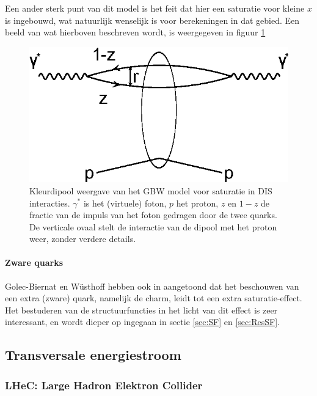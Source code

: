 \documentclass[a4paper,11pt]{article}
\numberwithin{equation}{section} %
\begin{document}
Een ander sterk punt van dit model is het feit dat hier een saturatie voor kleine $x$ is ingebouwd, wat natuurlijk wenselijk is voor berekeningen in dat gebied.
Een beeld van wat hierboven beschreven wordt, is weergegeven in figuur \ref{fig:GBW}
\begin{figure} [H]
  \begin{center}
    \includegraphics[width=.66\textwidth]{Afbeeldingen/GBW.eps}
    \caption{Kleurdipool weergave van het GBW model voor saturatie in DIS interacties. $\gamma^*$ is het (virtuele) foton, $p$ het proton, $z$ en $1-z$ de fractie van de impuls van het foton gedragen door de twee quarks. De verticale ovaal stelt de interactie van de dipool met het proton weer, zonder verdere details. \cite{ET}}
   \label{fig:GBW}
  \end{center}
\end{figure}

      \paragraph{Zware quarks}
Golec-Biernat en Wüsthoff hebben ook in \cite{GBW} aangetoond dat het beschouwen van een extra (zware) quark, namelijk de charm, leidt tot een extra saturatie-effect.
Het bestuderen van de structuurfuncties in het licht van dit effect is zeer interessant, en wordt dieper op ingegaan in sectie \ref{sec:SF} en \ref{sec:ResSF}.

  \subsection{Transversale energiestroom}
    \subsubsection{LHeC: Large Hadron Elektron Collider}
\end{document}
